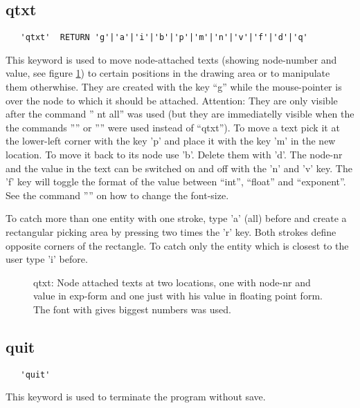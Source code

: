 \documentclass{article}
\begin{document}
\subsection{\label{qtxt}qtxt}
\begin{verbatim}
   'qtxt'  RETURN 'g'|'a'|'i'|'b'|'p'|'m'|'n'|'v'|'f'|'d'|'q' 
\end{verbatim}
This keyword is used to move node-attached texts (showing node-number and value, see figure \ref{qtxtp}) to certain positions in the drawing area or to manipulate them otherwhise. They are created with the key ``g'' while the mouse-pointer is over the node to which it should be attached. Attention: They are only visible after the command '' nt all'' was used (but they are immediatelly visible when the the commands '''' or '''' were used instead of ``qtxt''). To move a text pick it at the lower-left corner with the key 'p' and place it with the key 'm' in the new location. To move it back to its node use 'b'. Delete them with 'd'. The node-nr and the value in the text can be switched on and off with the 'n' and 'v' key. The 'f' key will toggle the format of the value between ``int'', ``float'' and ``exponent''. See the command '''' on how to change the font-size.

To catch more than one entity with one stroke, type 'a' (all) before and create a rectangular picking area by pressing two times the 'r' key. Both strokes define opposite corners of the rectangle. To catch only the entity which is closest to the user type 'i' before.
  
\begin{figure}[h]
\caption{\label{qtxtp}qtxt: Node attached texts at two locations, one with node-nr and value in exp-form and one just with his value in floating point form. The font with gives biggest numbers was used.}
\end{figure}

\subsection{\label{quit}quit}
\begin{verbatim}
   'quit' 
\end{verbatim}
This keyword is used to terminate the program without save. 
\end{document}
